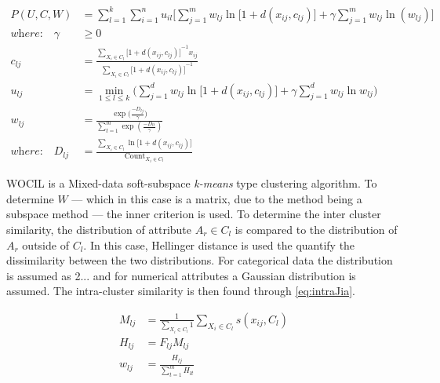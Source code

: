 \documentclass[../report.tex]{subfiles}
\begin{document}
\begin{align}
    P(U,C,W) &= \sum^k_{l=1} \sum^n_{i=1} u_{il} \Bigg[ \sum^m_{j=1} w_{ lj } \ln\big[1 + d(x_{ij},c_{lj})\big] + \gamma \sum_{j=1}^{m}{ w_{lj} \ln (w_{lj}) } \Bigg] \\
  \label{eq:lekm}
  \textit{where:}\quad\gamma&\geq 0 \\
          c_{lj} &= \frac{\sum_{X_i \in C_l}{ {\big[1 + d(x_{ij},c_{ lj })\big]}^{-1} x_{ij} }}{\sum_{X_i \in C_l}{\big[1 + d(x_{ij},c_{ lj })\big]}^{-1}} \\
          u_{lj} &= \min_{1 \leq l \leq k}\Bigg(\sum_{j=1}^{d} w_{lj} \ln\big[1 + d(x_{ij},c_{ lj })\big] + \gamma \sum_{j=1}^{d} w_{lj} \ln w_{lj}\Bigg) \\
          w_{lj} &= \frac{\exp({\frac{-D_{lj}}{\gamma})}}{\sum_{t=1}^{m}{\exp{(\frac{-D_{lt}}{\gamma})}}} \\
          \textit{where:}\quad D_{ lj } &= \frac{\sum_{X_i \in C_l}{\ln\big[1 + d(x_{ij},c_{ lj })\big]}}{\text{Count}_{X_i \in C_l}}
  \label{eq:lekm2}
\end{align}

WOCIL \cite{Jia2018} is a Mixed-data soft-subspace \textit{k-means} type clustering algorithm.
To determine $W$ --- which in this case is a matrix, due to the method being a subspace method --- the inner criterion is used. To determine the inter cluster similarity, the distribution of attribute $A_r \in C_l$ is compared to the distribution of $A_r$ outside of $C_l$. In this case, Hellinger distance is used the quantify the dissimilarity between the two distributions. For categorical data the distribution is assumed as 2... and for numerical attributes a Gaussian distribution is assumed. The intra-cluster similarity is then found through \ref{eq:intraJia}.

\begin{align}
  M_{lj} &= \frac{1}{\sum_{X_i \in C_{l}}{1}} \sum_{X_i \in C_{l}}{s(x_{ ij }, C_l)} \\
\label{eq:intraJia}
 H_{ lj } &= F_{ lj} M_{ lj } \\
  w_{lj} & = \frac{H_{lj}}{\sum_{t = 1}^{m}{H_{lt}}}
\label{eq:Jiaweight}
\end{align}
\end{document}
